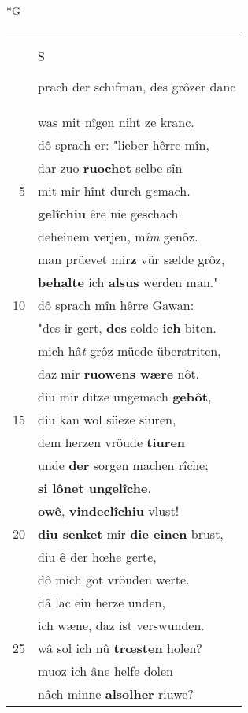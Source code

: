 \documentclass[8pt,a4paper,notitlepage]{article}
\begin{document}
\begin{table}[ht]
\begin{minipage}[t]{0.5\linewidth}
\small
\begin{center}*G
\end{center}
\begin{tabular}{rl}
 & \begin{large}S\end{large}prach der schifman, des grôzer danc\\ 
 & was mit nîgen niht ze kranc.\\ 
 & dô sprach er: "lieber hêrre mîn,\\ 
 & dar zuo \textbf{ruochet} selbe sîn\\ 
5 & mit mir hînt durch g\textit{e}mach.\\ 
 & \textbf{gelîchiu} êre nie geschach\\ 
 & deheinem verjen, m\textit{îm} genôz.\\ 
 & man prüevet mir\textbf{z} vür sælde grôz,\\ 
 & \textbf{behalte} ich \textbf{alsus} werden man."\\ 
10 & dô sprach mîn hêrre Gawan:\\ 
 & "des ir gert, \textbf{des} solde \textbf{ich} biten.\\ 
 & mich hâ\textit{t} grôz müede überstriten,\\ 
 & daz mir \textbf{ruowens wære} nôt.\\ 
 & diu mir ditze ungemach \textbf{gebôt},\\ 
15 & diu kan wol süeze siuren,\\ 
 & dem herzen vröude \textbf{tiuren}\\ 
 & unde \textbf{der} sorgen machen rîche;\\ 
 & \textbf{si lônet ungelîche}.\\ 
 & \textbf{owê}, \textbf{vindeclîchiu} vlust!\\ 
20 & \textbf{diu senket} mir \textbf{die einen} brust,\\ 
 & diu \textbf{ê} der hœhe gerte,\\ 
 & dô mich got vröuden werte.\\ 
 & dâ lac ein herze unden,\\ 
 & ich wæne, daz ist verswunden.\\ 
25 & wâ sol ich nû \textbf{trœsten} holen?\\ 
 & muoz ich âne helfe dolen\\ 
 & nâch minne \textbf{alsolher} riuwe?\\ 

\end{tabular}
\end{minipage}
\end{table}
\end{document}
